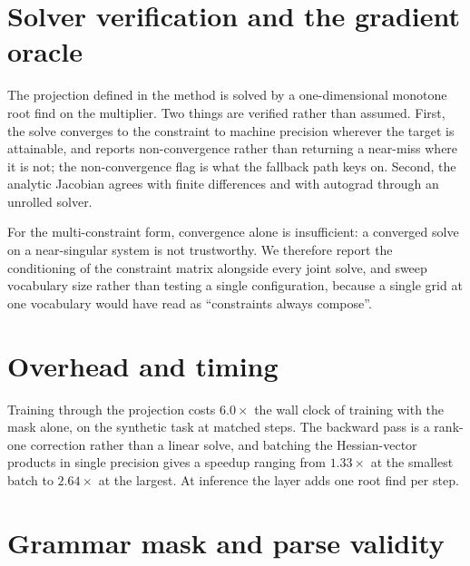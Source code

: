 \renewcommand{\thesection}{S\arabic{section}}
\renewcommand{\thefigure}{S\arabic{figure}}
\renewcommand{\thetable}{S\arabic{table}}
\setcounter{section}{0}\setcounter{figure}{0}\setcounter{table}{0}

\section{Solver verification and the gradient oracle}
\label{si:solver}

The projection defined in the method is solved by a one-dimensional monotone root
find on the multiplier. Two things are verified rather than assumed. First, the solve
converges to the constraint to machine precision wherever the target is attainable, and
reports non-convergence rather than returning a near-miss where it is not; the
non-convergence flag is what the fallback path keys on. Second, the analytic Jacobian
agrees with finite differences and with autograd through an unrolled solver.

For the multi-constraint form, convergence alone is insufficient: a converged solve on a
near-singular system is not trustworthy. We therefore report the conditioning of the
constraint matrix alongside every joint solve, and sweep vocabulary size rather than
testing a single configuration, because a single grid at one vocabulary would have read as
``constraints always compose''.

\section{Overhead and timing}
\label{si:overhead}

Training through the projection costs $6.0\times$ the wall clock of training with the
mask alone, on the synthetic task at matched steps. The backward pass is a rank-one
correction rather than a linear solve, and batching the Hessian-vector products in
single precision gives a speedup ranging from $1.33\times$ at the smallest batch to
$2.64\times$ at the largest. At inference the layer adds one root find per step.

\section{Grammar mask and parse validity}
\label{si:parse}

